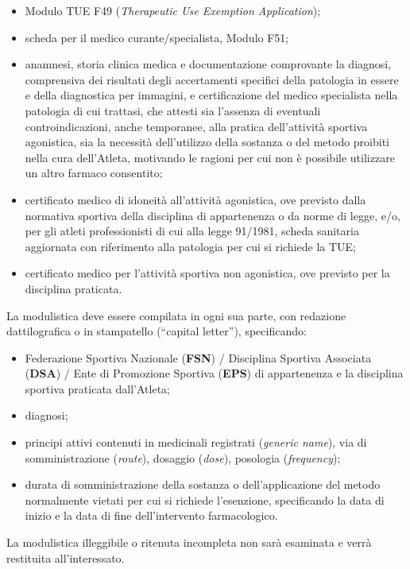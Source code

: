 \begin{itemize}
  \item Modulo TUE F49 (\textit{Therapeutic Use Exemption Application});
  \item scheda per il medico curante/specialista, Modulo F51;
  \item anamnesi, storia clinica medica e documentazione comprovante la diagnosi, comprensiva dei
    risultati degli accertamenti specifici della patologia in essere e della diagnostica per
    immagini, e certificazione del medico specialista nella patologia di cui trattasi, che
    attesti sia l'assenza di eventuali controindicazioni, anche temporanee, alla pratica
    dell'attività sportiva agonistica, sia la necessità dell'utilizzo della sostanza o del metodo
    proibiti nella cura dell'Atleta, motivando le ragioni per cui non è possibile utilizzare un
    altro farmaco consentito;
  \item certificato medico di idoneità all'attività agonistica, ove previsto dalla normativa
    sportiva della disciplina di appartenenza o da norme di legge, e/o, per gli atleti
    professionisti di cui alla legge 91/1981, scheda sanitaria aggiornata con riferimento alla
    patologia per cui si richiede la TUE;
  \item certificato medico per l'attività sportiva non agonistica, ove previsto per la disciplina
    praticata.
\end{itemize}

La modulistica deve essere compilata in ogni sua parte, con redazione dattilografica o in
stampatello (``capital letter''), specificando:
\begin{itemize}
  \item Federazione Sportiva Nazionale (\textbf{FSN}) / Disciplina Sportiva Associata
    (\textbf{DSA}) / Ente di Promozione Sportiva (\textbf{EPS}) di appartenenza e la disciplina
    sportiva praticata dall'Atleta;
  \item diagnosi;
  \item principi attivi contenuti in medicinali registrati (\textit{generic name}), via di
    somministrazione (\textit{route}), dosaggio (\textit{dose}), posologia (\textit{frequency});
  \item durata di somministrazione della sostanza o dell'applicazione del metodo normalmente
    vietati per cui si richiede l'esenzione, specificando la data di inizio e la data di fine
    dell'intervento farmacologico.
\end{itemize}
La modulistica illeggibile o ritenuta incompleta non sarà esaminata e verrà restituita
all'interessato.

